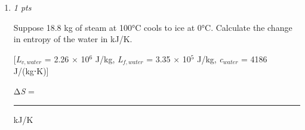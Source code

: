 \documentclass[11pt]{article}
\begin{document}
\begin{enumerate}[leftmargin=*,label=\textbf{Question \arabic*.}]
\item \hfill \textit{1 pts}

Suppose 18.8 kg of steam at 100°C cools to ice at 0°C. Calculate the change in entropy of the water in kJ/K.

[\emph{L}$_{v,water}$ = 2.26 × 10$^{6}$ J/kg, \emph{L}$_{f,water}$ = 3.35 × 10$^{5}$ J/kg, \emph{c}$_{water}$ = 4186 J/(kg⋅K)]



Δ\emph{S} = \rule{2.5cm}{0.4pt} kJ/K

\end{enumerate}
\end{document}

